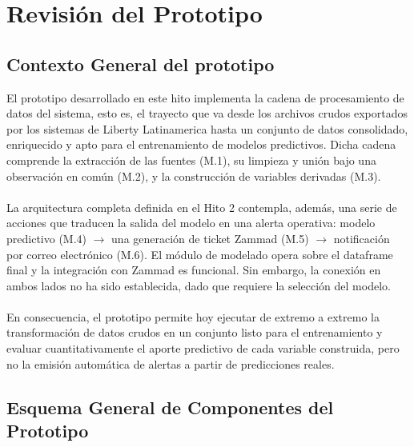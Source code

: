 \documentclass[12pt,a4paper]{article}
\begin{document}
\section{Revisión del Prototipo}
\subsection{Contexto General del prototipo}
\noindent
El prototipo desarrollado en este hito implementa la cadena de procesamiento de datos del sistema, esto es, el trayecto que va desde los archivos crudos exportados por los sistemas de Liberty Latinamerica hasta
un conjunto de datos consolidado, enriquecido y apto para el entrenamiento de modelos predictivos. Dicha cadena comprende la extracción de las fuentes (M.1), su limpieza y unión bajo una observación en común (M.2), y la construcción de
variables derivadas (M.3).\\\\

\noindent
La arquitectura completa definida en el Hito 2 contempla, además, una serie de acciones que traducen la salida del modelo en una alerta operativa: modelo predictivo (M.4) $\rightarrow$ una generación de ticket Zammad (M.5) $\rightarrow$ notificación por correo electrónico (M.6).
El módulo de modelado opera sobre el dataframe final y la integración con Zammad es funcional. Sin embargo, la conexión en ambos lados no ha sido establecida, dado que requiere la selección del modelo.\\\\

\noindent
En consecuencia, el prototipo permite hoy ejecutar de extremo a extremo la transformación de datos crudos en un conjunto listo para el entrenamiento y evaluar cuantitativamente el aporte predictivo de cada variable
construida, pero no la emisión automática de alertas a partir de predicciones reales.


\subsection{Esquema General de Componentes del Prototipo}
\end{document}
